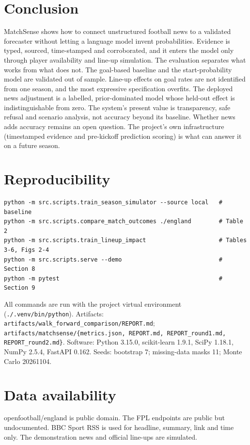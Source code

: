 \documentclass[11pt,a4paper]{article}
\newcommand{\code}[1]{\texttt{\small #1}}
\begin{document}
\section{Conclusion}\label{sec:conclusion}
MatchSense shows how to connect unstructured football news to a validated
forecaster without letting a language model invent probabilities. Evidence is
typed, sourced, time-stamped and corroborated, and it enters the model only
through player availability and line-up simulation. The evaluation separates
what works from what does not. The goal-based baseline and the start-probability
model are validated out of sample. Line-up effects on goal rates are not
identified from one season, and the most expressive specification overfits.
The deployed news adjustment is a labelled, prior-dominated model whose
held-out effect is indistinguishable from zero. The system's present value is
transparency, safe refusal and scenario analysis, not accuracy beyond its
baseline. Whether news adds accuracy remains an open question. The project's
own infrastructure (timestamped evidence and pre-kickoff prediction scoring) is
what can answer it on a future season.




\appendix
\section{Reproducibility}\label{app:repro}
{\footnotesize
\begin{verbatim}
python -m src.scripts.train_season_simulator --source local   # baseline
python -m src.scripts.compare_match_outcomes ./england        # Table 2
python -m src.scripts.train_lineup_impact                     # Tables 3-6, Figs 2-4
python -m src.scripts.serve --demo                            # Section 8
python -m pytest                                              # Section 9
\end{verbatim}}
\noindent All commands are run with the project virtual environment
(\code{./.venv/bin/python}).
Artifacts: \code{artifacts/walk\_forward\_comparison/REPORT.md};
\code{artifacts/matchsense/\{metrics.json, REPORT.md, REPORT\_round1.md,
REPORT\_round2.md\}}. Software: Python 3.15.0, scikit-learn 1.9.1, SciPy
1.18.1, NumPy 2.5.4, FastAPI 0.162. Seeds: bootstrap 7; missing-data masks 11;
Monte Carlo 20261104.

\section{Data availability}
openfootball/england is public domain. The FPL endpoints are public but
undocumented. BBC Sport RSS is used for headline, summary, link and time only.
The demonstration news and official line-ups are simulated.
\end{document}
